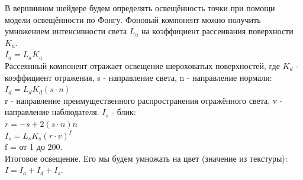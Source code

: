\documentclass[a4paper,14pt]{extarticle}
\begin{document}
В вершинном шейдере будем определять освещённость точки при помощи модели освещённости
по Фонгу. Фоновый компонент можно получить умножением интенсивности света $L_a$ на
коэффициент рассеивания поверхности $K_a$.\\
$I_a = L_a K_a$\\
Рассеянный компонент отражает освещение шероховатых поверхностей, где $K_d$ - коэффициент отражения, s - направление света, 
n - направление нормали:\\
$I_d = L_d K_d (s \cdot n)$\\
r - направление преимущественного распространения отражённого света, v - направление наблюдателя. 
$I_s$ - блик:\\
$r = -s + 2 (s \cdot n) n$\\
$I_s = L_s K_s (r \cdot v) ^ f$\\
f = от 1 до 200.\\
Итоговое освещение. Его мы будем умножать на цвет (значение из текстуры):\\
$I = I_a + I_d + I_s$.\\
\end{document}
